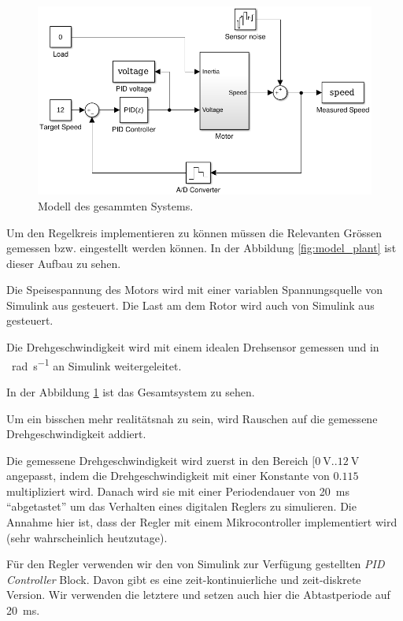 \begin{figure}
    \centering
    \includegraphics[width=\imagewidth]{images/model}
    \caption{Modell des gesammten Systems.}
    \label{fig:model}
\end{figure}

\clearpage

Um den Regelkreis implementieren zu k\"onnen m\"ussen die Relevanten Gr\"ossen
gemessen    bzw.    eingestellt    werden   k\"onnen.   In    der    Abbildung
\ref{fig:model_plant} ist dieser Aufbau zu sehen.

Die Speisespannung  des  Motors  wird  mit einer variablen Spannungsquelle von
Simulink  aus  gesteuert.  Die Last am dem Rotor wird auch  von  Simulink  aus
gesteuert.

Die Drehgeschwindigkeit wird  mit  einem  idealen  Drehsensor  gemessen und in
\SI{}{\radian\per\second} an Simulink weitergeleitet.

In   der   Abbildung   \ref{fig:model}   ist   das  Gesamtsystem   zu   sehen.

Um ein bisschen mehr realit\"atsnah zu sein, wird  Rauschen  auf die gemessene
Drehgeschwindigkeit addiert.

Die    gemessene    Drehgeschwindigkeit   wird   zuerst   in    den    Bereich
$[\SI{0}{\volt}..\SI{12}{\volt}$  angepasst, indem die Drehgeschwindigkeit mit
einer  Konstante  von  $0.115$  multipliziert wird. Danach wird sie mit  einer
Periodendauer von \SI{20}{\milli\second} ``abgetastet'' um das Verhalten eines
digitalen  Reglers  zu  simulieren. Die Annahme hier ist, dass der Regler  mit
einem  Mikrocontroller implementiert wird  (sehr  wahrscheinlich  heutzutage).

F\"ur den Regler verwenden wir  den  von  Simulink  zur Verf\"ugung gestellten
\textit{PID Controller} Block.  Davon  gibt  es  eine zeit-kontinuierliche und
zeit-diskrete Version. Wir verwenden die  letztere  und  setzen  auch hier die
Abtastperiode auf \SI{20}{\milli\second}.

